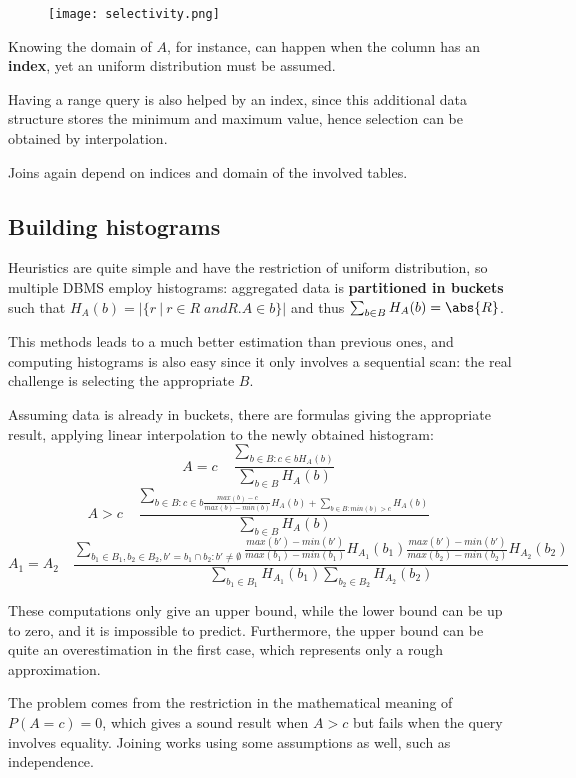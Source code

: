 \begin{wrapfigure}{R}{0.6\textwidth}
	\vspace{-20pt}
	\texttt{[image: selectivity.png]}
	\vspace{-30pt}
\end{wrapfigure}

Knowing the domain of $A$, for instance, can happen when the column has an \textbf{index}, yet an uniform distribution must be assumed.

Having a range query is also helped by an index, since this additional data structure stores the minimum and maximum value, hence selection can be obtained by interpolation. 

Joins again depend on indices and domain of the involved tables.

\subsection{Building histograms}
Heuristics are quite simple and have the restriction of uniform distribution, so multiple DBMS employ histograms: aggregated data is \textbf{partitioned in buckets} such that $H_A(b) = |\{r\ |\ r \in R \;and R.A \in b\}|$ and thus $\sum_{b \in B} H_A(b) = \abs{R}$.

This methods leads to a much better estimation than previous ones, and computing histograms is also easy since it only involves a sequential scan: the real challenge is selecting the appropriate $B$.

Assuming data is already in buckets, there are formulas giving the appropriate result, applying linear interpolation to the newly obtained histogram:
$$A = c \quad \frac{\sum_{b \in B:c \in b H_A(b)}}{\sum_{b \in B}H_A(b)}$$
$$A > c \quad \frac{\sum_{b \in B:c \in b \frac{max(b) - c}{max(b) - min(b)} H_A(b) + \sum_{b \in B:min(b) > c} H_A(b)}}{\sum_{b \in B}H_A(b)}$$
$$A_1 = A_2 \quad \frac{\sum_{b_1 \in B_1, b_2 \in B_2, b' = b_1 \cap b_2: b' \neq \emptyset} \frac{max(b') - min(b')}{max(b_1) - min(b_1)} H_{A_1}(b_1) \frac{max(b') - min(b')}{max(b_2) - min(b_2)} H_{A_2}(b_2)}{\sum_{b_1 \in B_1}H_{A_1}(b_1) \sum_{b_2 \in B_2}H_{A_2}(b_2)}$$

These computations only give an upper bound, while the lower bound can be up to zero, and it is impossible to predict. Furthermore, the upper bound can be quite an overestimation in the first case, which represents only a rough approximation.

The problem comes from the restriction in the mathematical meaning of $P(A = c) = 0$, which gives a sound result when $A > c$ but fails when the query involves equality. Joining works using some assumptions as well, such as independence.

